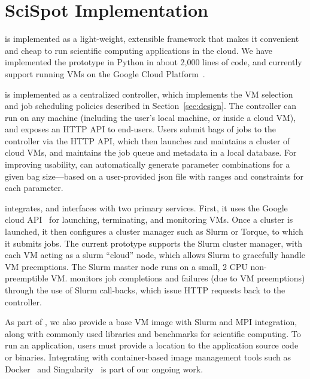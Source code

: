 \vspace*{\subsecspace}
\section{SciSpot Implementation}
\label{sec:impl}

\sysname is implemented as a light-weight, extensible framework that makes it convenient and cheap to run scientific computing applications in the cloud.
We have implemented the \sysname prototype in Python in about 2,000 lines of code, and currently support running VMs on the Google Cloud Platform~\cite{gcp}. 

\sysname is implemented as a centralized controller, which implements the VM selection and job scheduling policies described in Section~\ref{sec:design}. 
The controller can run on any machine (including the user's local machine, or inside a cloud VM), and exposes an HTTP API to end-users. 
Users submit bags of jobs to the controller via the HTTP API, which then launches and maintains a cluster of cloud VMs, and maintains the job queue and metadata in a local database. 
For improving usability, \sysname can automatically generate parameter combinations for a given bag size---based on a user-provided json file with ranges and constraints for each parameter. 


\sysname integrates, and interfaces with two primary services.
First, it uses the Google cloud API~\cite{gcloud-api} for launching, terminating, and monitoring VMs.
Once a cluster is launched, it then configures a cluster manager such as Slurm or Torque, to which it submits jobs. 
The current \sysname prototype supports the Slurm cluster manager, with each VM acting as a slurm ``cloud'' node, which allows Slurm to gracefully handle VM preemptions.
The Slurm master node runs on a small, 2 CPU non-preemptible VM. 
\sysname monitors job completions and failures (due to VM preemptions) through the use of Slurm call-backs, which issue HTTP requests back to the \sysname controller.

As part of \sysname, we also provide a base VM image with Slurm and MPI integration, along with commonly used libraries and benchmarks for scientific computing. To run an application, users must provide a location to the application source code or binaries. Integrating \sysname with container-based image management tools such as Docker~\cite{docker} and Singularity~\cite{kurtzer2017singularity} is part of our ongoing work. 





